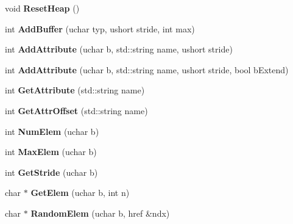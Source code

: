 \begin{DoxyCompactItemize}
\item 
\hypertarget{class_geom_x_ab5af32d6780fb8dbea81a825e20f99a9}{void {\bfseries Reset\+Heap} ()}\label{class_geom_x_ab5af32d6780fb8dbea81a825e20f99a9}

\item 
\hypertarget{class_geom_x_ae9bdbff31bf143ab39f41010e073dd43}{int {\bfseries Add\+Buffer} (uchar typ, ushort stride, int max)}\label{class_geom_x_ae9bdbff31bf143ab39f41010e073dd43}

\item 
\hypertarget{class_geom_x_a96de78d39bc6640a590f5ba2413a6596}{int {\bfseries Add\+Attribute} (uchar b, std\+::string name, ushort stride)}\label{class_geom_x_a96de78d39bc6640a590f5ba2413a6596}

\item 
\hypertarget{class_geom_x_a1f3aee132974162df93afbb1492ab296}{int {\bfseries Add\+Attribute} (uchar b, std\+::string name, ushort stride, bool b\+Extend)}\label{class_geom_x_a1f3aee132974162df93afbb1492ab296}

\item 
\hypertarget{class_geom_x_accefdc142ac43a53249b4be599f71379}{int {\bfseries Get\+Attribute} (std\+::string name)}\label{class_geom_x_accefdc142ac43a53249b4be599f71379}

\item 
\hypertarget{class_geom_x_a00a51b2901990945d6aff1c75a694a4e}{int {\bfseries Get\+Attr\+Offset} (std\+::string name)}\label{class_geom_x_a00a51b2901990945d6aff1c75a694a4e}

\item 
\hypertarget{class_geom_x_a6afc80ebcf5ab1212edd95be9e2c5a0e}{int {\bfseries Num\+Elem} (uchar b)}\label{class_geom_x_a6afc80ebcf5ab1212edd95be9e2c5a0e}

\item 
\hypertarget{class_geom_x_a5c11e57f7977e35dc227a3aad2324a98}{int {\bfseries Max\+Elem} (uchar b)}\label{class_geom_x_a5c11e57f7977e35dc227a3aad2324a98}

\item 
\hypertarget{class_geom_x_a679943424ccebbfcc9e660da9e0e293f}{int {\bfseries Get\+Stride} (uchar b)}\label{class_geom_x_a679943424ccebbfcc9e660da9e0e293f}

\item 
\hypertarget{class_geom_x_a39f011dc2ebf199dc0559c6b7b0a3489}{char $\ast$ {\bfseries Get\+Elem} (uchar b, int n)}\label{class_geom_x_a39f011dc2ebf199dc0559c6b7b0a3489}

\item 
\hypertarget{class_geom_x_a4d127241038a462a893740f266ccf833}{char $\ast$ {\bfseries Random\+Elem} (uchar b, href \&ndx)}\label{class_geom_x_a4d127241038a462a893740f266ccf833}


\end{DoxyCompactItemize}
